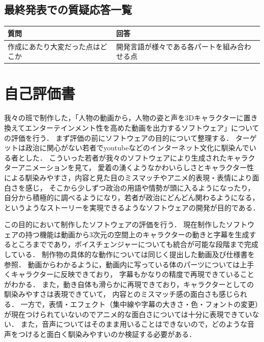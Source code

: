 \documentclass[a4paper,12pt]{jsarticle}
\begin{document}
\subsection{最終発表での質疑応答一覧}

\begin{table}[H]
	\begin{tabular}{|l|l|} \hline
		{\bf 質問} & {\bf 回答} \\ \hline \hline
		作成にあたり大変だった点はどこか & 開発言語が様々である各パートを組み合わせる点\\ \hline
	\end{tabular}
\end{table}

\section{自己評価書}
我々の班で制作した，「人物の動画から，人物の姿と声を3Dキャラクターに置き換えてエンターテインメント性を高めた動画を出力するソフトウェア」についての評価を行う．
まず評価の前にソフトウェアの目的について整理する．
ターゲットは政治に関心がない若者でyoutubeなどのインターネット文化に馴染んでいる者とした．
こういった若者が我々のソフトウェアにより生成されたキャラクターアニメーションを見て，
愛着の湧くようなかわいらしさとキャラクター性による馴染みやすさ，内容と見た目のミスマッチやアニメ的表現・表情により面白さを感じ，
そこから少しずつ政治の用語や情勢が頭に入るようになったり，
自分から積極的に調べるようになり，若者が政治にどんどん関わるようになる，
というようなストーリーを実現できるようなソフトウェアの開発が目的である．

この目的において制作したソフトウェアの評価を行う．
現在制作したソフトウェアの持つ機能は動画から3次元の空間上のキャラクターの動きと字幕を生成するところまでであり，ボイスチェンジャーについても統合が可能な段階まで完成している．
制作物の具体的な動作については同じく提出した動画及び仕様書を参照．
動画からわかるように，動画内に写っている体のパーツについては上手くキャラクターに反映できており，
字幕もかなりの精度で再現できていることがわかる．
また，動き自体も滑らかに再現できており，キャラクターとしての馴染みやすさは表現できていて，
内容とのミスマッチ感の面白さも感じられる．
一方で，表情・エフェクト（集中線や字幕の大きさ・色・フォントの変更）が現在つけられていないのでアニメ的な面白さについては十分に表現できていない．
また，音声についてはそのまま用いることはできないので，どのような音声をつけると面白く馴染みやすいのか検証する必要がある．
\end{document}

